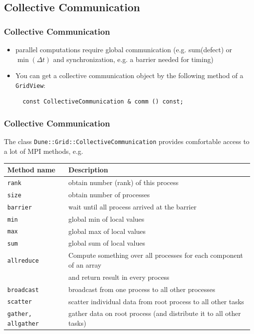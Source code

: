 \documentclass[aspectratio=169,11pt]{beamer}
\theoremstyle{definition}
\begin{document}
\subsection{Collective Communication}

\begin{frame}[fragile]
  \frametitle<presentation>{Collective Communication}
  \begin{itemize}
  \item parallel computations require global communication (e.g. sum(defect) or $\min(\Delta t)$
    and synchronization, e.g. a barrier needed for timing)
  \item You can get a collective communication object by the following method of a \lstinline!GridView!:
\begin{lstlisting}
  const CollectiveCommunication & comm () const;
\end{lstlisting}
  \end{itemize}
\vfill
\vfill
\vfill
\vfill
\vfill
\vfill

\end{frame}

\begin{frame}[fragile]
  \frametitle<presentation>{Collective Communication}
The class  \lstinline!Dune::Grid::CollectiveCommunication! provides comfortable access to a lot of MPI methods, e.g.\medskip
{}
    \begin{tabular}{l|p{10cm}}
      \hline
      Method name & Description\\\hline
      \lstinline!rank! & obtain number (rank) of this process\\
      \lstinline!size! & obtain number of processes \\
      \lstinline!barrier! & wait until all process arrived at the barrier\\
      \lstinline!min! & global min of local values\\
      \lstinline!max! & global max of local values\\
      \lstinline!sum! & global sum of local values\\
      \lstinline!allreduce! & Compute something over all processes for each component of an array \\
      &and return result in every process\\
      \lstinline!broadcast! & broadcast from one process to all other processes\\
      \lstinline!scatter! & scatter individual data from root process to all other tasks\\
      \lstinline!gather, allgather! & gather data on root process (and distribute it to all other tasks)\\
      \hline
    \end{tabular}

\end{frame}
\end{document}
